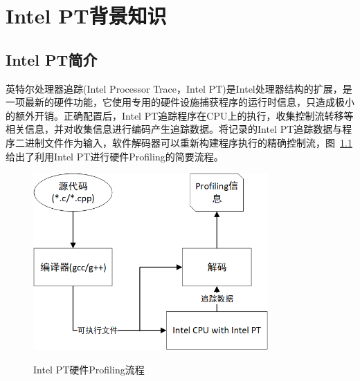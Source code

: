 
\chapter{Intel PT背景知识}

\section{Intel PT简介}
英特尔处理器追踪(Intel Processor Trace，Intel PT)是Intel处理器结构的扩展，是一项最新的硬件功能，它使用专用的硬件设施捕获程序的运行时信息，只造成极小的额外开销。正确配置后，Intel PT追踪程序在CPU上的执行，收集控制流转移等相关信息，并对收集信息进行编码产生追踪数据。将记录的Intel PT追踪数据与程序二进制文件作为输入，软件解码器可以重新构建程序执行的精确控制流，图~\ref{fig:bigbigpicture}给出了利用Intel PT进行硬件Profiling的简要流程。

\begin{figure}[!htb]
  \centering
  \includegraphics[width=0.8\textwidth]
  {figures/BIGBIGPicture.png}\\
  \caption{Intel PT硬件Profiling流程}
  \label{fig:bigbigpicture}
\end{figure}

